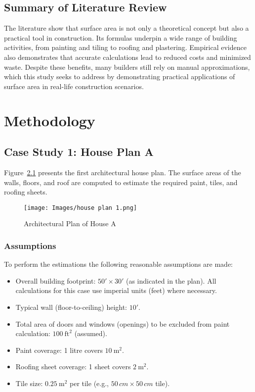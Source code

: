 \documentclass[12pt,a4paper,openany,titlepage,reqno, final]{report}
\theoremstyle{definition}
\begin{document}
	\section{Summary of Literature Review} The literature \cite{NGOWTANASUWAN2012537,akinola2015,eze2019,michael2019} show that surface area is not only a theoretical concept but also a practical tool in construction. Its formulas underpin a wide range of building activities, from painting and tiling to roofing and plastering. Empirical evidence also demonstrates that accurate calculations lead to reduced costs and minimized waste. Despite these benefits, many builders still rely on manual approximations, which this study seeks to address by demonstrating practical applications of surface area in real-life construction scenarios.
	
	
	
	\chapter{Methodology}
	

	\section{Case Study 1: House Plan A}
	Figure~\ref{fig:house1} presents the first architectural house plan. The surface areas of the walls, floors, and roof are computed to estimate the required paint, tiles, and roofing sheets.
	
	\begin{figure}[h!]
		\centering
		\texttt{[image: Images/house plan 1.png]}
		\caption{Architectural Plan of House A}
		\label{fig:house1}
	\end{figure}
	
	\subsection{Assumptions}
	To perform the estimations the following reasonable assumptions are made:
	\begin{itemize}
		\item Overall building footprint: $50' \times 30'$ (as indicated in the plan). All calculations for this case use imperial units (feet) where necessary.
		\item Typical wall (floor-to-ceiling) height: $10'$.
		\item Total area of doors and windows (openings) to be excluded from paint calculation: $100\ \text{ft}^2$ (assumed).
		\item Paint coverage: 1 litre covers $10\ \text{m}^2$.
		\item Roofing sheet coverage: 1 sheet covers $2\ \text{m}^2$.
		\item Tile size: $0.25\ \text{m}^2$ per tile (e.g., $50\,cm\times50\,cm$ tile).
	\end{itemize}
	
\end{document}
